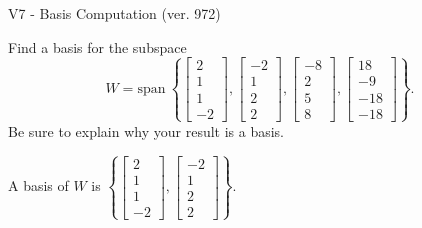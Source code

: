 \begin{exercise}
  \begin{exerciseTitle}V7 - Basis Computation (ver. 972)\end{exerciseTitle}
  \begin{exerciseStatement}
    Find a basis for the subspace 
\[W=\mathrm{span}\ \left\{\left[\begin{array}{r}
2 \\
1 \\
1 \\
-2
\end{array}\right] , \left[\begin{array}{r}
-2 \\
1 \\
2 \\
2
\end{array}\right] , \left[\begin{array}{r}
-8 \\
2 \\
5 \\
8
\end{array}\right] , \left[\begin{array}{r}
18 \\
-9 \\
-18 \\
-18
\end{array}\right]\right\}.\]
 Be sure to explain why your result is a basis.


  \end{exerciseStatement}
  \begin{exerciseAnswer}
   A basis of \(W\) is  \(\left\{\left[\begin{array}{r}
2 \\
1 \\
1 \\
-2
\end{array}\right] , \left[\begin{array}{r}
-2 \\
1 \\
2 \\
2
\end{array}\right]\right\}\).
  


  \end{exerciseAnswer}
\end{exercise}